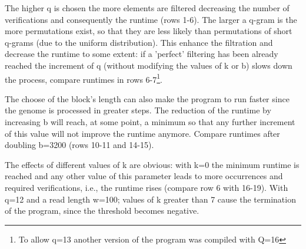 \documentclass[11pt, notitlepage]{scrartcl}
\begin{document}
The higher q is chosen the more elements are filtered decreasing the number of verifications and consequently the runtime (rows 1-6). The larger a q-gram is the more permutations exist, so that they are less likely than permutations of short q-grams (due to the uniform distribution). This enhance the filtration and decrease the runtime to some extent: if a 'perfect' filtering has been already reached the increment of q (without modifying  the values of k or b) slows down the process, compare runtimes in rows 6-7\footnote{To allow q=13 another version of the program was compiled with Q=16}.

The choose of the block's length can also make the program to run faster since the genome is processed in greater steps. The reduction of the runtime by increasing b will reach, at some point, a minimum so that any further increment of this value will not improve the runtime anymore. Compare runtimes after doubling b=3200 (rows 10-11 and 14-15).

The effects of different values of k are obvious: with k=0 the minimum runtime is reached and any other value of this parameter leads to more occurrences and required verifications, i.e., the runtime rises (compare row 6 with 16-19). With q=12 and a read length w=100; values of k greater than 7 cause the termination of the program, since the threshold becomes negative.


\end{document}
